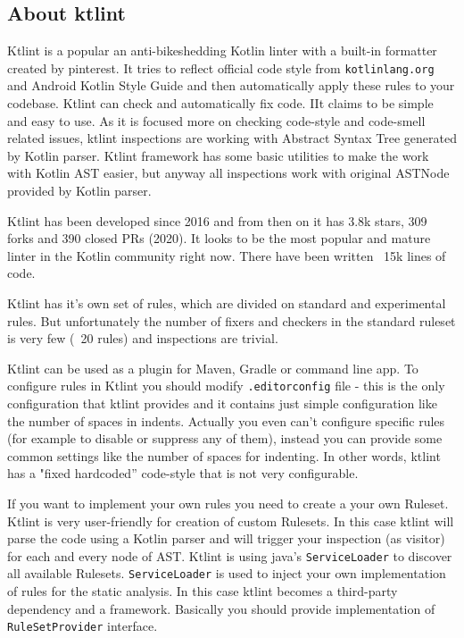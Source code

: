 \subsection{About ktlint}
Ktlint is a popular an anti-bikeshedding Kotlin linter with a built-in formatter created by pinterest. It tries to reflect official code style from \texttt{kotlinlang.org} and Android Kotlin Style Guide and then automatically apply these rules to your codebase. Ktlint can check and automatically fix code. IIt claims to be simple and easy to use. As it is focused more on checking code-style and code-smell related issues, ktlint inspections are working with Abstract Syntax Tree generated by Kotlin parser. Ktlint framework has some basic utilities to make the work with Kotlin AST easier, but anyway all inspections work with original ASTNode provided by Kotlin parser.

Ktlint has been developed since 2016 and from then on it has 3.8k stars, 309 forks and 390 closed PRs (2020). It looks to be the most popular and mature linter in the Kotlin community right now. There have been written ~15k lines of code.

Ktlint has it’s own set of rules, which are divided on standard and experimental rules. But unfortunately the number of fixers and checkers in the standard ruleset is very few (~20 rules) and inspections are trivial. 

Ktlint can be used as a plugin for Maven, Gradle or command line app. To configure rules in Ktlint you should modify \texttt{.editorconfig} file - this is the only configuration that ktlint provides and it contains just simple configuration like the number of spaces in indents. Actually you even can’t configure specific rules (for example to disable or suppress any of them), instead you can provide some common settings like the number of spaces for indenting. In other words, ktlint has a "fixed hardcoded” code-style that is not very configurable. 

If you want to implement your own rules you need to create a your own Ruleset. Ktlint is very user-friendly for creation of custom Rulesets. In this case ktlint will parse the code using a Kotlin parser and will trigger your inspection (as visitor) for each and every node of AST. Ktlint is using java’s \texttt{ServiceLoader} to discover all available Rulesets. \texttt{ServiceLoader} is used to inject your own implementation of rules for the static analysis. In this case ktlint becomes a third-party dependency and a framework. Basically you should provide implementation of \texttt{RuleSetProvider} interface.

